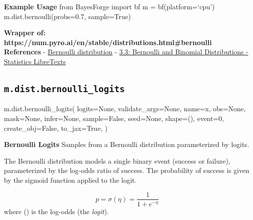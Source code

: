 \documentclass[
  letterpaper,
  DIV=11,
  numbers=noendperiod]{scrartcl}
\newenvironment{Shaded}{\begin{snugshade}}{\end{snugshade}}
\newcommand{\DecValTok}[1]{\textcolor[rgb]{0.68,0.00,0.00}{#1}}
\newcommand{\NormalTok}[1]{\textcolor[rgb]{0.00,0.23,0.31}{#1}}
\newcommand{\OperatorTok}[1]{\textcolor[rgb]{0.37,0.37,0.37}{#1}}
\newcommand{\StringTok}[1]{\textcolor[rgb]{0.13,0.47,0.30}{#1}}
\newcommand{\VariableTok}[1]{\textcolor[rgb]{0.07,0.07,0.07}{#1}}
\begin{document}
\textbf{Example Usage} from BayesForge import bf m = bf(platform=`cpu')
m.dist.bernoulli(probs=0.7, sample=True)

\textbf{Wrapper of:
https://num.pyro.ai/en/stable/distributions.html\#bernoulli}
\textbf{References} -
\href{https://en.wikipedia.org/wiki/Bernoulli_distribution}{Bernoulli
distribution} -
\href{https://stats.libretexts.org/Courses/Saint_Mary\%27s_College_Notre_Dame/MATH_345__-_Probability_\%28Kuter\%29/3\%3A_Discrete_Random_Variables/3.3\%3A_Bernoulli_and_Binomial_Distributions}{3.3:
Bernoulli and Binomial Distributions - Statistics LibreTexts}

\subsection{\texorpdfstring{\texttt{m.dist.bernoulli\_logits}}{m.dist.bernoulli\_logits}}\label{bernoulli_logits}

\begin{Shaded}
\begin{Highlighting}[]
\NormalTok{m.dist.bernoulli\_logits(}
\NormalTok{    logits}\OperatorTok{=}\VariableTok{None}\NormalTok{,}
\NormalTok{    validate\_args}\OperatorTok{=}\VariableTok{None}\NormalTok{,}
\NormalTok{    name}\OperatorTok{=}\StringTok{\textquotesingle{}x\textquotesingle{}}\NormalTok{,}
\NormalTok{    obs}\OperatorTok{=}\VariableTok{None}\NormalTok{,}
\NormalTok{    mask}\OperatorTok{=}\VariableTok{None}\NormalTok{,}
\NormalTok{    infer}\OperatorTok{=}\VariableTok{None}\NormalTok{,}
\NormalTok{    sample}\OperatorTok{=}\VariableTok{False}\NormalTok{,}
\NormalTok{    seed}\OperatorTok{=}\VariableTok{None}\NormalTok{,}
\NormalTok{    shape}\OperatorTok{=}\NormalTok{(),}
\NormalTok{    event}\OperatorTok{=}\DecValTok{0}\NormalTok{,}
\NormalTok{    create\_obj}\OperatorTok{=}\VariableTok{False}\NormalTok{,}
\NormalTok{    to\_jax}\OperatorTok{=}\VariableTok{True}\NormalTok{,}
\NormalTok{)}
\end{Highlighting}
\end{Shaded}

\textbf{Bernoulli Logits} Samples from a Bernoulli distribution
parameterized by logits.

The Bernoulli distribution models a single binary event (success or
failure), parameterized by the log-odds ratio of success. The
probability of success is given by the sigmoid function applied to the
logit.

\[
  p = \sigma(\eta) = \frac{1}{1 + e^{-\eta}}
  \] where (\eta) is the log-odds (the \emph{logit}).
\end{document}
